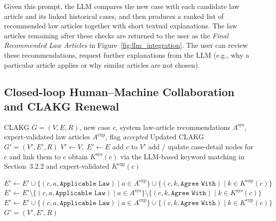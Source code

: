 \documentclass[review,times,nonatbib]{elsarticle} %
\renewcommand{\textcolor}[2]{#2}
\begin{document}
\textcolor{blue}{Given this prompt, the LLM compares the new case with each candidate law article and its linked historical cases, and then produces a ranked list of recommended law articles together with short textual explanations. The law articles remaining after these checks are returned to the user as the \emph{Final Recommended Law Articles} in Figure~\ref{fig:llm_integration}. The user can review these recommendations, request further explanations from the LLM (e.g., why a particular article applies or why similar articles are not chosen).}


\subsection{\textcolor{blue}{Closed-loop Human--Machine Collaboration and CLAKG Renewal}}
\label{sec33}

\begin{algorithm}[h]
\small
\caption{\textcolor{blue}{CLAKG Update with Human Feedback}}
\label{algorithm_update}
\begin{algorithmic}[1]
\Require CLAKG $G=(V,E,R)$, new case $c$, system law-article recommendations $A^{\text{sys}}$, expert-validated law articles $A^{\text{exp}}$, flag \textit{accepted}
\Ensure Updated CLAKG $G'=(V',E',R)$
\State $V' \gets V,\; E' \gets E$
 add $c$ to $V'$ \EndIf
\State add / update case-detail nodes for $c$ and link them to $c$
\State obtain $K^{\text{sys}}(c)$ via the LLM-based keyword matching in Section~3.2.2 and expert-validated $K^{\text{exp}}(c)$

  
    \State $E' \gets E' \cup \{(c,a,\texttt{Applicable Law}) \mid a \in A^{\text{exp}}\} \cup \{(c,k,\texttt{Agree With}) \mid k \in K^{\text{exp}}(c)\}$
\Else                                        {}
    \State $E' \gets E' 
      \setminus \{(c,a,\texttt{Applicable Law}) \mid a \in A^{\text{sys}}\} 
      \setminus \{(c,k,\texttt{Agree With}) \mid k \in K^{\text{sys}}(c)\}$
    \State $E' \gets E' 
      \cup \{(c,a,\texttt{Applicable Law}) \mid a \in A^{\text{exp}}\} 
      \cup \{(c,k,\texttt{Agree With}) \mid k \in K^{\text{exp}}(c)\}$
\EndIf
\State \Return $G'=(V',E',R)$
\end{algorithmic}
\end{algorithm}
\end{document}

